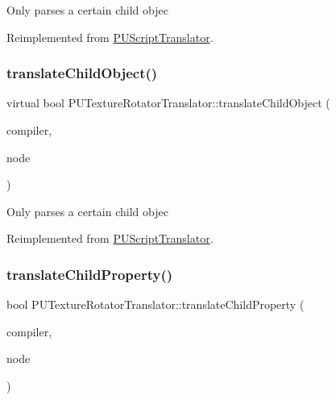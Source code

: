 Only parses a certain child objec 

Reimplemented from \hyperlink{classPUScriptTranslator_ab587d01348ae3e678cb700c719b2b113}{P\+U\+Script\+Translator}.

\mbox{\label{classPUTextureRotatorTranslator_a04704b854bb48d3e30519c0bbe425783}} 
\subsubsection{\texorpdfstring{translate\+Child\+Object()}{translateChildObject()}\hspace{0.1cm}{\footnotesize\ttfamily [2/2]}}
{\footnotesize\ttfamily virtual bool P\+U\+Texture\+Rotator\+Translator\+::translate\+Child\+Object (\begin{DoxyParamCaption}\item[{\hyperlink{classPUScriptCompiler}{P\+U\+Script\+Compiler} $\ast$}]{compiler,  }\item[{\hyperlink{classPUAbstractNode}{P\+U\+Abstract\+Node} $\ast$}]{node }\end{DoxyParamCaption})\hspace{0.3cm}{\ttfamily [virtual]}}

Only parses a certain child objec 

Reimplemented from \hyperlink{classPUScriptTranslator_ab587d01348ae3e678cb700c719b2b113}{P\+U\+Script\+Translator}.

\mbox{\label{classPUTextureRotatorTranslator_ab71568514f72f7cf6121222b52887dcd}} 
\subsubsection{\texorpdfstring{translate\+Child\+Property()}{translateChildProperty()}\hspace{0.1cm}{\footnotesize\ttfamily [1/2]}}
{\footnotesize\ttfamily bool P\+U\+Texture\+Rotator\+Translator\+::translate\+Child\+Property (\begin{DoxyParamCaption}\item[{\hyperlink{classPUScriptCompiler}{P\+U\+Script\+Compiler} $\ast$}]{compiler,  }\item[{\hyperlink{classPUAbstractNode}{P\+U\+Abstract\+Node} $\ast$}]{node }\end{DoxyParamCaption})\hspace{0.3cm}{\ttfamily [virtual]}}

